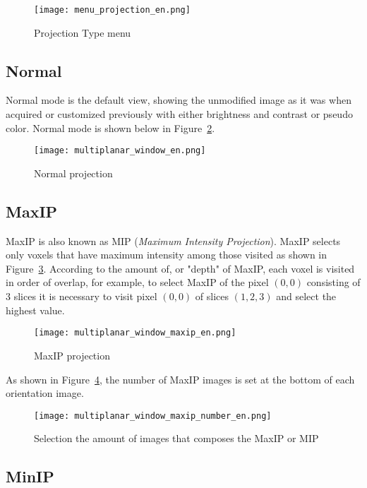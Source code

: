 \begin{figure}[!h]
\centering
\texttt{[image: menu\_projection\_en.png]}
\caption{Projection Type menu}
\label{fig:menu_proj}
\end{figure}

\subsection{Normal}

Normal mode is the default view, showing the unmodified image as it was when acquired or customized previously with either brightness and contrast or pseudo color. Normal mode is shown below in Figure~\ref{fig:proj_normal}.

\begin{figure}[!h]
\centering
\texttt{[image: multiplanar\_window\_en.png]}
\caption{Normal projection}
\label{fig:proj_normal}
\end{figure}

\subsection{MaxIP}
\label{sec:max_ip}

MaxIP is also known as MIP (\textit{Maximum Intensity Projection}). MaxIP selects only voxels that have maximum intensity among those visited as shown in Figure~\ref{fig:proj_maxip}. According to the amount of, or "depth" of MaxIP, each voxel is visited in order of overlap, for example, to select MaxIP of the pixel $(0, 0)$ consisting of 3 slices it is necessary to visit pixel $(0, 0)$ of slices $(1, 2, 3)$ and select the highest value.

\begin{figure}[!h]
\centering
\texttt{[image: multiplanar\_window\_maxip\_en.png]}
\caption{MaxIP projection}
\label{fig:proj_maxip}
\end{figure}

As shown in Figure~\ref{fig:proj_maxip_qtd}, the number of MaxIP images is set at the bottom of each orientation image.

\begin{figure}[!h]
\centering
\texttt{[image: multiplanar\_window\_maxip\_number\_en.png]}
\caption{Selection the amount of images that composes the MaxIP or MIP}
\label{fig:proj_maxip_qtd}
\end{figure}

\subsection{MinIP}

